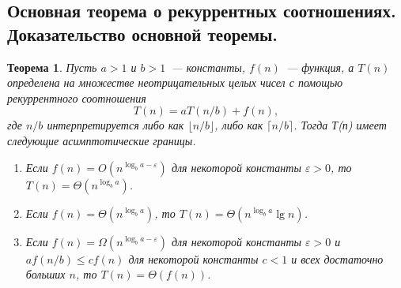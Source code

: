 \documentclass[a4paper,12pt]{article}
\newtheorem*{theorem}{Теорема}
\begin{document}
\subsection{Основная теорема о рекуррентных соотношениях. Доказательство основной теоремы.}
\begin{theorem}
	
	Пусть \(a > 1\) и \(b > 1\)~--- константы, \(f(n)\)~--- функция, а \(T(n)\) определена на множестве неотрицательных целых чисел с помощью рекуррентного соотношения \[T(n) = aT(n/b) + f(n),\] где \(n/b\) интерпретируется либо как \(\lfloor n/b \rfloor\), либо как \(\lceil n/b\rceil\). Тогда Т(п) имеет следующие асимптотические границы.
	\begin{enumerate}
		\item Если \(f(n) = O(n^{\log_b a - \varepsilon})\) для некоторой константы \(\varepsilon > 0\), то \(T(n) = \Theta(n^{\log_b a})\).
		\item Если \(f(n) = \Theta(n^{\log_b a})\), то \(T(n) = \Theta(n^{\log_b a}\lg n)\).
		\item Если \(f(n) = \Omega(n^{\log_b a - \varepsilon})\) для некоторой константы \(\varepsilon > 0\) и \(af(n/b) \leqslant cf(n)\) для некоторой константы \(c < 1\) и всех достаточно больших \(n\), то \(T(n) = \Theta(f(n))\).
	\end{enumerate}
\end{theorem}
\end{document}
